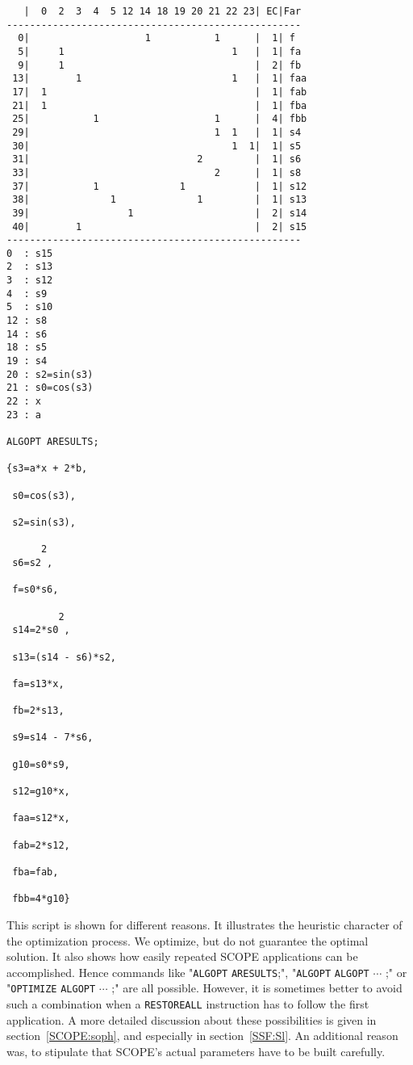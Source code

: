 {\begin{verbatim}
   |  0  2  3  4  5 12 14 18 19 20 21 22 23| EC|Far
---------------------------------------------------
  0|                    1           1      |  1| f
  5|     1                             1   |  1| fa
  9|     1                                 |  2| fb
 13|        1                          1   |  1| faa
 17|  1                                    |  1| fab
 21|  1                                    |  1| fba
 25|           1                    1      |  4| fbb
 29|                                1  1   |  1| s4
 30|                                   1  1|  1| s5
 31|                             2         |  1| s6
 33|                                2      |  1| s8
 37|           1              1            |  1| s12
 38|              1              1         |  1| s13
 39|                 1                     |  2| s14
 40|        1                              |  2| s15
---------------------------------------------------
0  : s15
2  : s13
3  : s12
4  : s9
5  : s10
12 : s8
14 : s6
18 : s5
19 : s4
20 : s2=sin(s3)
21 : s0=cos(s3)
22 : x
23 : a

ALGOPT ARESULTS;

{s3=a*x + 2*b,

 s0=cos(s3),

 s2=sin(s3),

      2
 s6=s2 ,

 f=s0*s6,

         2
 s14=2*s0 ,

 s13=(s14 - s6)*s2,

 fa=s13*x,

 fb=2*s13,

 s9=s14 - 7*s6,

 g10=s0*s9,

 s12=g10*x,

 faa=s12*x,

 fab=2*s12,

 fba=fab,

 fbb=4*g10}     
\end{verbatim}}
This script is shown for different reasons. It illustrates the heuristic 
character of the optimization process. We optimize, but do not guarantee 
the optimal solution. It also shows how easily repeated SCOPE applications
can be accomplished. Hence commands like "{\tt ALGOPT} {\tt ARESULTS};", 
"{\tt ALGOPT} {\tt ALGOPT} $\cdots$ ;" 
or "{\tt OPTIMIZE} {\tt ALGOPT} $\cdots$ ;" are all possible.
However, it is sometimes better to avoid such a combination when a 
{\tt RESTOREALL} instruction has to follow the first application.
A more detailed discussion about these possibilities is given in 
section~\ref{SCOPE:soph}, and especially in section~\ref{SSF:Sl}.
An additional reason was, to stipulate that SCOPE's actual parameters
have to be built carefully.

